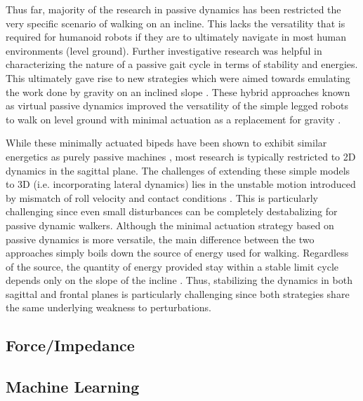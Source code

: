Thus far, majority of the research in passive dynamics has been restricted the very specific scenario of walking on an incline. This lacks the versatility that is required for humanoid robots if they are to ultimately navigate in most human environments (level ground). Further investigative research was helpful in characterizing the nature of a passive gait cycle \cite{Goswami:1996gn} in terms of stability and energies. This ultimately gave rise to new strategies which were aimed towards emulating the work done by gravity on an inclined slope \cite{Asano:2000wi}. These hybrid approaches known as virtual passive dynamics improved the versatility of the simple legged robots to walk on level ground with minimal actuation as a replacement for gravity \cite{Asano:2004tv}. 

While these minimally actuated bipeds have been shown to exhibit similar energetics as purely passive machines \cite{Asano:2004jp}, most research is typically restricted to 2D dynamics in the sagittal plane. The challenges of extending these simple models to 3D (i.e. incorporating lateral dynamics) lies in the unstable motion introduced by mismatch of roll velocity and contact conditions \cite{Kuo:1999tn}. This is particularly challenging since even small disturbances can be completely destabalizing for passive dynamic walkers. Although the minimal actuation strategy based on passive dynamics is more versatile, the main difference between the two approaches simply boils down the source of energy used for walking. Regardless of the source, the quantity of energy provided stay within a stable limit cycle depends only on the slope of the incline \cite{Goswami:1996gn}. Thus, stabilizing the dynamics in both sagittal and frontal planes is particularly challenging since both strategies share the same underlying weakness to perturbations. 


\subsection{Force/Impedance} %
\label{sub:related_force_impedance}
\Incomplete


\subsection{Machine Learning} %
\label{sub:related_machine_learning}
\Incomplete


